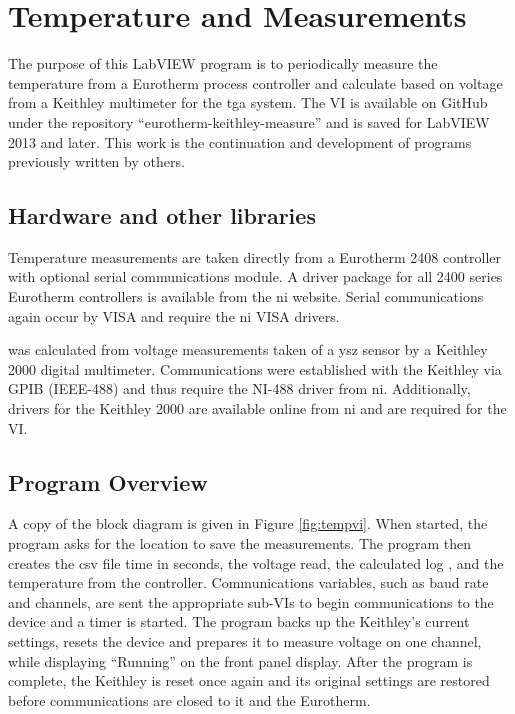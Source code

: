 \section{Temperature and  Measurements}
    \label{app:tgavi}
    The purpose of this LabVIEW program is to periodically measure the temperature from a Eurotherm process controller and calculate  based on voltage from a Keithley multimeter for the \gls{tga} system.
    The VI is available on GitHub under the repository ``eurotherm-keithley-measure'' and is saved for LabVIEW 2013 and later.
    This work is the continuation and development of programs previously written by others.

    \subsection{Hardware and other libraries}
    Temperature measurements are taken directly from a Eurotherm 2408 controller with optional serial communications module.
    A driver package for all 2400 series Eurotherm controllers is available from the \gls{ni} website.
    Serial communications again occur by VISA and require the \gls{ni} VISA drivers.

     was calculated from voltage measurements taken of a \gls{ysz} sensor by a Keithley 2000 digital multimeter.
    Communications were established with the Keithley via GPIB (IEEE-488) and thus require the NI-488 driver from \gls{ni}.
    Additionally, drivers for the Keithley 2000 are available online from \gls{ni} and are required for the VI.

    \subsection{Program Overview}
    A copy of the block diagram is given in Figure \ref{fig:tempvi}.
    When started, the program asks for the location to save the measurements.
    The program then creates the \gls{csv} file time in seconds, the voltage read, the calculated log , and the temperature from the controller.
    Communications variables, such as baud rate and channels, are sent the appropriate sub-VIs to begin communications to the device and a timer is started.
    The program backs up the Keithley's current settings, resets the device and prepares it to measure voltage on one channel, while displaying ``Running'' on the front panel display.
    After the program is complete, the Keithley is reset once again and its original settings are restored before communications are closed to it and the Eurotherm.

